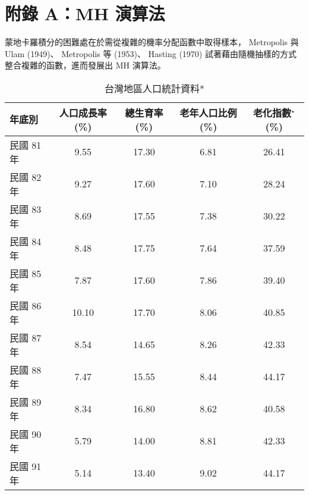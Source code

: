 \chapter*{附錄 A：MH 演算法} 
\renewcommand{\thetable}{A.\arabic{table}}
\hspace{7mm}蒙地卡羅積分的困難處在於需從複雜的機率分配函數中取得樣本，
Metropolis 與 Ulam (1949)、 Metropolis 等 (1953)、 Hasting (1970)
試著藉由隨機抽樣的方式整合複雜的函數，進而發展出 MH 演算法。

\begin{table}[H]
    \centering
        \caption{台灣地區人口統計資料*}\label{b_ol}
        \fontsize{9}{14pt}\selectfont %
\begin{tabular}{lcccc}
    \toprule
       年底別 &  人口成長率(\%) &   總生育率(\%) & 老年人口比例(\%) &   老化指數$^\star$(\%) \\
\hline
     民國 81 年 &      9.55  &     17.30  &      6.81  &     26.41  \\

     民國 82 年 &      9.27  &     17.60  &      7.10  &     28.24  \\

     民國 83 年 &      8.69  &     17.55  &      7.38  &     30.22  \\

     民國 84 年 &      8.48  &     17.75  &      7.64  &     37.59  \\

     民國 85 年 &      7.87  &     17.60  &      7.86  &     39.40  \\

     民國 86 年 &     10.10  &     17.70  &      8.06  &     40.85  \\

     民國 87 年 &      8.54  &     14.65  &      8.26  &     42.33  \\

     民國 88 年 &      7.47  &     15.55  &      8.44  &     44.17  \\

     民國 89 年 &      8.34  &     16.80  &      8.62  &     40.58  \\

     民國 90 年 &      5.79  &     14.00  &      8.81  &     42.33  \\

     民國 91 年 &      5.14  &     13.40  &      9.02  &     44.17  \\


\end{tabular}
\end{table}
